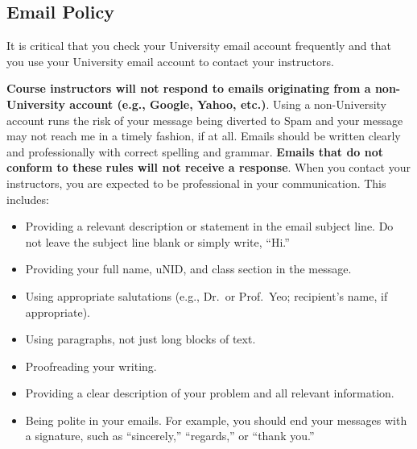 \documentclass[
  letterpaper,
]{article}
\providecommand{\tightlist}{%
  \setlength{\itemsep}{0pt}\setlength{\parskip}{0pt}}\usepackage{longtable,booktabs,array}
\begin{document}
\subsection{Email Policy}\label{email-policy}

\begin{tcolorbox}[enhanced jigsaw, left=2mm, toptitle=1mm, opacitybacktitle=0.6, leftrule=.75mm, title=\textcolor{quarto-callout-note-color}{\faInfo}\hspace{0.5em}{Note}, colback=white, colframe=quarto-callout-note-color-frame, toprule=.15mm, rightrule=.15mm, coltitle=black, arc=.35mm, bottomtitle=1mm, colbacktitle=quarto-callout-note-color!10!white, breakable, bottomrule=.15mm, titlerule=0mm, opacityback=0]

It is critical that you check your University email account frequently
and that you use your University email account to contact your
instructors.

\end{tcolorbox}

\textbf{Course instructors will not respond to emails originating from a
non-University account (e.g., Google, Yahoo, etc.)}. Using a
non-University account runs the risk of your message being diverted to
Spam and your message may not reach me in a timely fashion, if at all.
Emails should be written clearly and professionally with correct
spelling and grammar. \textbf{Emails that do not conform to these rules
will not receive a response}. When you contact your instructors, you are
expected to be professional in your communication. This includes:

\begin{itemize}
\tightlist
\item
  Providing a relevant description or statement in the email subject
  line. Do not leave the subject line blank or simply write, ``Hi.''
\item
  Providing your full name, uNID, and class section in the message.
\item
  Using appropriate salutations (e.g., Dr.~or Prof.~Yeo; recipient's
  name, if appropriate).
\item
  Using paragraphs, not just long blocks of text.
\item
  Proofreading your writing.
\item
  Providing a clear description of your problem and all relevant
  information.
\item
  Being polite in your emails. For example, you should end your messages
  with a signature, such as ``sincerely,'' ``regards,'' or ``thank
  you.''
\end{itemize}
\end{document}
